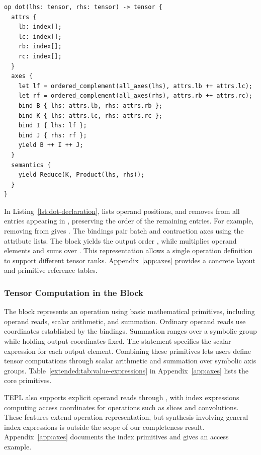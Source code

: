 \begin{codeblock}[H]
\begin{lstlisting}[language=TEPL,
  caption={Axes IR representation of generalized dot, with explicit attributes, axis bindings, and value semantics.},
  label={lst:dot-declaration}]
op dot(lhs: tensor, rhs: tensor) -> tensor {
  attrs {
    lb: index[];
    lc: index[];
    rb: index[];
    rc: index[];
  }
  axes {
    let lf = ordered_complement(all_axes(lhs), attrs.lb ++ attrs.lc);
    let rf = ordered_complement(all_axes(rhs), attrs.rb ++ attrs.rc);
    bind B { lhs: attrs.lb, rhs: attrs.rb };
    bind K { lhs: attrs.lc, rhs: attrs.rc };
    bind I { lhs: lf };
    bind J { rhs: rf };
    yield B ++ I ++ J;
  }
  semantics {
    yield Reduce(K, Product(lhs, rhs));
  }
}
\end{lstlisting}
\end{codeblock}
In Listing~\ref{lst:dot-declaration},  lists operand positions,
and  removes from  all entries
appearing in , preserving the order of the remaining entries.
For example, removing \code{[0,1]} from \code{[2,0,3,1]} gives \code{[2,3]}.
The bindings pair batch and contraction axes using the attribute
lists. The  block yields the output order ,
while  multiplies operand elements and sums over .
This representation allows a single operation definition to support
different tensor ranks. Appendix~\ref{app:axes} provides a concrete layout
and primitive reference tables.
\FloatBarrier
\subsubsection{Tensor Computation in the \texorpdfstring{}{semantics} Block}
\label{sec:value-expressions}
The  block represents an operation using basic mathematical
primitives, including operand reads, scalar arithmetic, and summation.
Ordinary operand reads use coordinates established by the 
bindings. Summation ranges over a symbolic group while holding output
coordinates fixed. The  statement specifies the scalar
expression for each output element. Combining these primitives lets users
define tensor computations through scalar arithmetic and summation over
symbolic axis groups. Table~\ref{extended:tab:value-expressions} in
Appendix~\ref{app:axes} lists the core primitives.

TEPL also supports explicit operand reads through ,
with index expressions computing access coordinates for operations such
as slices and convolutions. These features extend operation representation,
but synthesis involving general index expressions is outside the scope
of our completeness result. Appendix~\ref{app:axes} documents the index
primitives and gives an access example.
